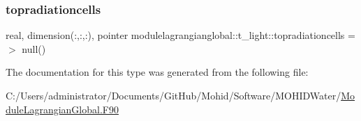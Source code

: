 \mbox{\label{structmodulelagrangianglobal_1_1t__light_aaec02bfb2007f6f7880ef075b5a24fe6}} 
\subsubsection{\texorpdfstring{topradiationcells}{topradiationcells}}
{\footnotesize\ttfamily real, dimension(\+:,\+:,\+:), pointer modulelagrangianglobal\+::t\+\_\+light\+::topradiationcells =$>$ null()\hspace{0.3cm}{\ttfamily [private]}}



The documentation for this type was generated from the following file\+:\begin{DoxyCompactItemize}
\item 
C\+:/\+Users/administrator/\+Documents/\+Git\+Hub/\+Mohid/\+Software/\+M\+O\+H\+I\+D\+Water/\mbox{\hyperlink{_module_lagrangian_global_8_f90}{Module\+Lagrangian\+Global.\+F90}}\end{DoxyCompactItemize}
